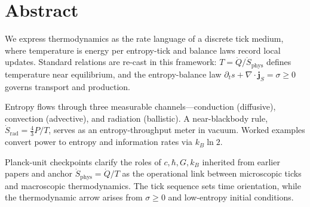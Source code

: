 \section*{Abstract}
We express thermodynamics as the rate language of a discrete tick medium,
where temperature is energy per entropy-tick and balance laws record local
updates. Standard relations are re-cast in this framework:
\(T=\dot Q/\dot S_{\mathrm{phys}}\) defines temperature near equilibrium, and
the entropy-balance law \(\partial_t s+\nabla\!\cdot\!\mathbf j_S=\sigma\ge0\)
governs transport and production.

Entropy flows through three measurable channels—conduction (diffusive),
convection (advective), and radiation (ballistic). A near-blackbody rule,
\(\dot S_{\mathrm{rad}}=\tfrac{4}{3}P/T\), serves as an entropy-throughput
meter in vacuum. Worked examples convert power to entropy and information
rates via \(k_B\ln2\).

Planck-unit checkpoints clarify the roles of \(c,\hbar,G,k_B\) inherited from
earlier papers and anchor \(\dot S_{\mathrm{phys}}=\dot Q/T\) as the operational
link between microscopic ticks and macroscopic thermodynamics. The tick
sequence sets time orientation, while the thermodynamic arrow arises from
\(\sigma\ge0\) and low-entropy initial conditions.
